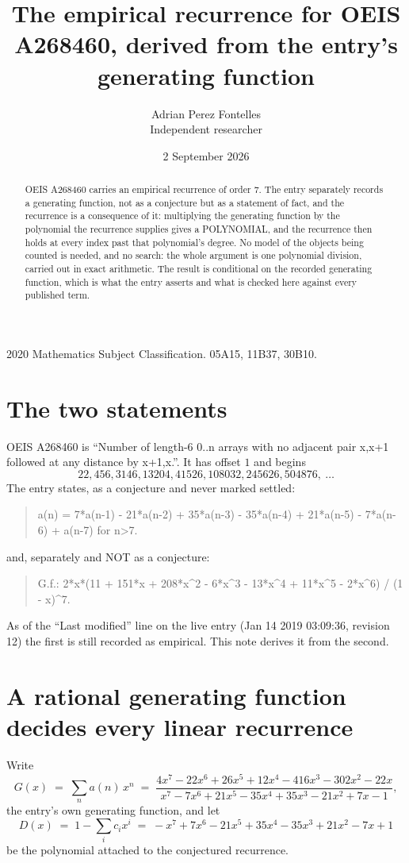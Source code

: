 \documentclass[11pt,a4paper]{article}
\title{The empirical recurrence for OEIS A268460, derived from the entry's generating function}
\author{Adrian Perez Fontelles\\ \small Independent researcher}
\date{2 September 2026}
\theoremstyle{plain}
\theoremstyle{definition}
\begin{document}
\maketitle

\begin{abstract}
OEIS A268460 carries an empirical recurrence of order $7$. The entry separately records a
generating function, not as a conjecture but as a statement of fact, and the recurrence is a
consequence of it: multiplying the generating function by the polynomial the recurrence
supplies gives a POLYNOMIAL, and the recurrence then holds at every index past that
polynomial's degree. No model of the objects being counted is needed, and no search: the
whole argument is one polynomial division, carried out in exact arithmetic. The result is
conditional on the recorded generating function, which is what the entry asserts and what is
checked here against every published term.
\end{abstract}

\noindent\small 2020 Mathematics Subject Classification. 05A15, 11B37, 30B10.\normalsize

\section{The two statements}

OEIS A268460 is ``Number of length-6 0..n arrays with no adjacent pair x,x+1 followed at any distance by x+1,x.''. It has offset $1$ and begins
\[
22, 456, 3146, 13204, 41526, 108032, 245626, 504876,\ \dots
\]
The entry states, as a conjecture and never marked settled:
\begin{quote}
a(n) = 7*a(n-1) - 21*a(n-2) + 35*a(n-3) - 35*a(n-4) + 21*a(n-5) - 7*a(n-6) + a(n-7) for n>7.
\end{quote}
and, separately and NOT as a conjecture:
\begin{quote}
G.f.: 2*x*(11 + 151*x + 208*x\^{}2 - 6*x\^{}3 - 13*x\^{}4 + 11*x\^{}5 - 2*x\^{}6) / (1 - x)\^{}7.
\end{quote}
As of the ``Last modified'' line on the live entry (Jan 14 2019 03:09:36, revision 12) the first is still
recorded as empirical. This note derives it from the second.

\section{A rational generating function decides every linear recurrence}

Write
\[
G(x)\;=\;\sum_{n}a(n)\,x^{n}\;=\;\frac{4 x^{7} - 22 x^{6} + 26 x^{5} + 12 x^{4} - 416 x^{3} - 302 x^{2} - 22 x}{x^{7} - 7 x^{6} + 21 x^{5} - 35 x^{4} + 35 x^{3} - 21 x^{2} + 7 x - 1},
\]
the entry's own generating function, and let
\[
D(x)\;=\;1-\sum_i c_i x^{i}\;=\;- x^{7} + 7 x^{6} - 21 x^{5} + 35 x^{4} - 35 x^{3} + 21 x^{2} - 7 x + 1
\]
be the polynomial attached to the conjectured recurrence.
\end{document}
